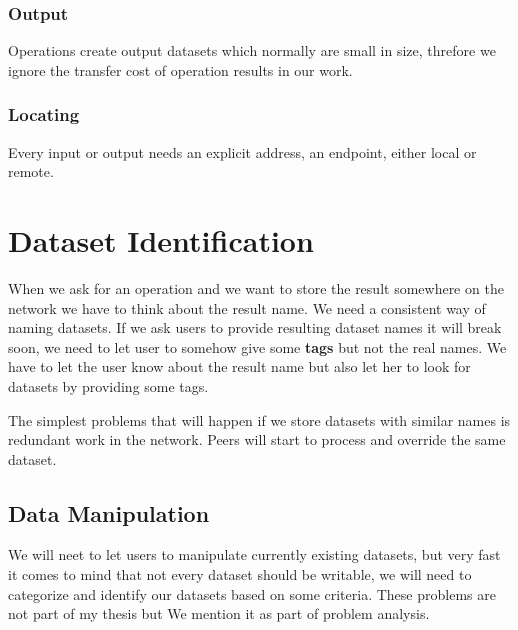 \subsubsection{Output}
Operations create output datasets which normally are small in size, threfore we ignore the transfer cost of operation
results in our work.

\subsubsection{Locating}
Every input or output needs an explicit address, an endpoint, either local or remote.

\section{Dataset Identification}
When we ask for an operation and we want to store the result somewhere on the network we have to think about the result name. 
We need a consistent way of naming datasets. If we ask users to provide resulting dataset names it will break soon, we need to 
let user to somehow give some \textbf{tags} but not the real names. We have to let the user know about the result name but also
let her to look for datasets by providing some tags.

The simplest problems that will happen if we store datasets with similar names is redundant work in the network. Peers will start 
to process and override the same dataset.

\subsection{Data Manipulation}
We will neet to let users to manipulate currently existing datasets, but very fast it comes to mind that not every dataset should be
writable, we will need to categorize and identify our datasets based on some criteria. These problems are not part of my thesis but
We mention it as part of problem analysis.


